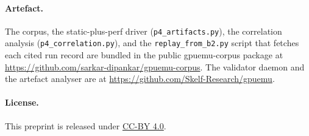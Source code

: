 \documentclass[runningheads]{llncs}
\begin{document}
\paragraph{Artefact.}
{\sloppy The corpus, the static-plus-perf driver
(\texttt{p4\_artifacts.py}), the correlation analysis
(\texttt{p4\_correlation.py}), and the
\texttt{replay\_from\_b2.py} script that fetches each cited run
record are bundled in the public \textsf{gpuemu-corpus} package at
\url{https://github.com/sarkar-dipankar/gpuemu-corpus}. The
validator daemon and the artefact analyser are at
\url{https://github.com/Skelf-Research/gpuemu}.\par}

\paragraph{License.}
This preprint is released under
\href{https://creativecommons.org/licenses/by/4.0/}{CC-BY 4.0}.



\end{document}

